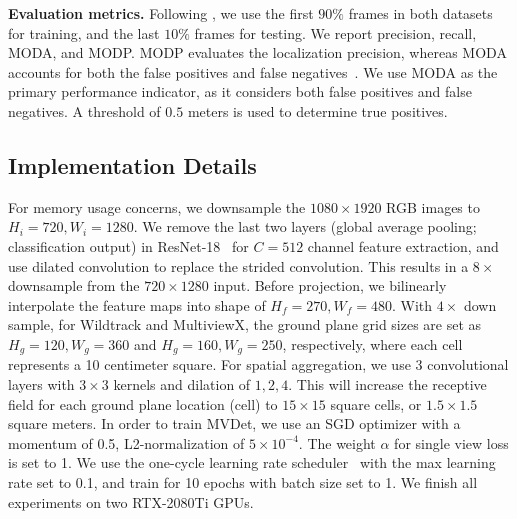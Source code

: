 \documentclass[runningheads]{llncs}
\begin{document}
\textbf{Evaluation metrics. }
Following \cite{chavdarova2018wildtrack}, we use the first $90\%$ frames in both datasets for training, and the last $10\%$ frames for testing. 
We report precision, recall, MODA, and MODP. MODP evaluates the localization precision, whereas MODA accounts for both the false positives and false negatives~\cite{kasturi2008framework}. We use MODA as the primary performance indicator, as it considers both false positives and false negatives. A threshold of $0.5$ meters is used to determine true positives. 

\subsection{Implementation Details}
\label{sec:sec:implementation}
For memory usage concerns, we downsample the $1080\times 1920$ RGB images to $H_i=720, W_i=1280$. We remove the last two layers (global average pooling; classification output) in ResNet-18~\cite{he2016deep} for $C=512$ channel feature extraction, and use dilated convolution to replace the strided convolution. This results in a $8\times$ downsample from the $720\times1280$ input. Before projection, we bilinearly interpolate the feature maps into shape of $H_f=270, W_f=480$. With $4\times$ down sample, for Wildtrack and MultiviewX, the ground plane grid sizes are set as $H_g=120,W_g=360$ and $H_g=160,W_g=250$, respectively, where each cell represents a 10 centimeter square. For spatial aggregation, we use 3 convolutional layers with $3\times 3$ kernels and dilation of $1,2,4$. This will increase the receptive field for each ground plane location (cell) to $15\times 15$ square cells, or $1.5\times 1.5$ square meters. 
In order to train MVDet, we use an SGD optimizer with a momentum of 0.5, L2-normalization of $5\times 10^{-4}$. The weight $\alpha$ for single view loss is set to 1. We use the one-cycle learning rate scheduler~\cite{smith2019super} with the max learning rate set to 0.1, and train for 10 epochs with batch size set to 1. We finish all experiments on two RTX-2080Ti GPUs. 
\end{document}
